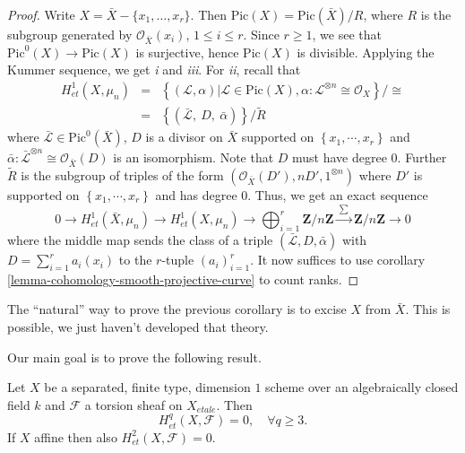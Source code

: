 \begin{proof}
Write $X = \bar X - \{ x_1, \dots, x_r\}$. Then $\text{Pic}(X) =
\text{Pic}(\bar X)/ R$, where $R$ is the subgroup generated by
$\mathcal{O}_{\bar X}(x_i)$, $1 \leq i \leq r$. Since $r \geq 1$, we see that
$\text{Pic}^0(X) \to \text{Pic}(X)$ is surjective, hence $\text{Pic}(X)$ is
divisible. Applying the Kummer sequence, we get {\it i} and {\it iii}. For {\it
ii}, recall that
\begin{eqnarray*}
H_{et}^1(X, \mu_n) & = &
\left\{
(\mathcal L, \alpha) | \mathcal L \in \text{Pic}(X),
\alpha: \mathcal{L}^{\otimes n} \cong \mathcal{O}_X
\right\}
{\bigg /} {\cong} \\
& = &
\left\{(\bar{\mathcal L}, \ D, \ \bar \alpha) \right\} {\big /} \tilde{R}
\end{eqnarray*}
where $\bar{\mathcal L} \in \text{Pic}^0(\bar X)$, $D$ is a divisor on $\bar X$
supported on $\left\{x_1, \cdots, x_r\right\}$ and $ \bar{\alpha}:
\bar{\mathcal L}^{\otimes n} \cong \mathcal{O}_{\bar{X}}(D)$ is an isomorphism.
Note that $D$ must have degree 0. Further $\tilde{R}$ is the subgroup of
triples of the form $(\mathcal{O}_{\bar X}(D'), n D', 1^{\otimes n})$ where
$D'$ is supported on $\left\{x_1, \cdots, x_r\right\}$ and has degree 0. Thus,
we get an exact sequence
$$
0 \longrightarrow
H_{et}^1(\bar X, \mu_n) \longrightarrow
H_{et}^1(X, \mu_n) \longrightarrow
\bigoplus_{i=1}^r \mathbf{Z}/n\mathbf{Z}
\xrightarrow{\ \sum\ }
\mathbf{Z}/n\mathbf{Z} \longrightarrow 0
$$
where the middle map sends the class of a triple $(\bar{ \mathcal L}, D, \bar
\alpha)$ with $D = \sum_{i=1}^r a_i (x_i)$ to the $r$-tuple $(a_i)_{i=1}^r$. It
now suffices to use corollary \ref{lemma-cohomology-smooth-projective-curve} to
count ranks.
\end{proof}

\begin{remark}
\label{remark-natural-proof}
The ``natural'' way to prove the previous corollary is to excise $X$ from $\bar
X$. This is possible, we just haven't developed that theory.
\end{remark}

\noindent
Our main goal is to prove the following result.

\begin{theorem}
\label{theorem-vanishing-curves}
Let $X$ be a separated, finite type, dimension $1$ scheme over an algebraically
closed field $k$ and $\mathcal{F}$ a torsion sheaf on $X_{etale}$. Then
$$
H_{et}^q(X, \mathcal{F}) = 0, \quad \forall q\geq 3.
$$
If $X$ affine then also $H_{et}^2(X, \mathcal{F}) = 0$.
\end{theorem}	

